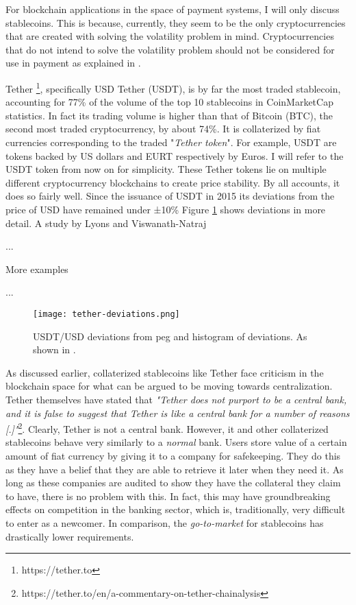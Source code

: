 For blockchain applications in the space of payment systems, I will
only discuss stablecoins. This is because, currently, they seem to be
the only cryptocurrencies that are created with solving the volatility
problem in mind. Cryptocurrencies that do not intend to solve the
volatility problem should not be considered for use in payment as
explained in \cite{yermackBitcoin}.

Tether \footnote{https://tether.to}, specifically USD Tether (USDT),
is by far the most traded stablecoin, accounting for 77\% of the
volume of the top 10 stablecoins in CoinMarketCap statistics. In fact
its trading volume is higher than that of Bitcoin (BTC), the second
most traded cryptocurrency, by about 74\%. It is collaterized by fiat
currencies corresponding to the traded "\textit{Tether token}". For
example, USDT are tokens backed by US dollars and EURT respectively by
Euros. I will refer to the USDT token from now on for simplicity.
These Tether tokens lie on multiple different cryptocurrency
blockchains to create price stability. By all accounts, it does so
fairly well. Since the issuance of USDT in 2015 its deviations from
the price of USD have remained under ±10\% Figure
\ref{fig:tether-deviations} shows deviations in more detail. A study
by Lyons and Viswanath-Natraj \cite{lyonsStable} 

...

More examples

...

\begin{figure}
  \texttt{[image: tether-deviations.png]}
  \caption{USDT/USD deviations from peg and histogram of deviations.
  As shown in \cite{lyonsStable}.}
  \label{fig:tether-deviations}
\end{figure}

As discussed earlier, collaterized stablecoins like Tether face
criticism in the blockchain space for what can be argued to be moving
towards centralization. Tether themselves have stated that
\textit{"Tether does not purport to be a central bank, and it is false
to suggest that Tether is like a central bank for a number of reasons
[.]"}\footnote{https://tether.to/en/a-commentary-on-tether-chainalysis}.
Clearly, Tether is not a central bank. However, it and other
collaterized stablecoins behave very similarly to a \textit{normal}
bank. Users store value of a certain amount of fiat currency by giving
it to a company for safekeeping. They do this as they have a belief
that they are able to retrieve it later when they need it. As long as
these companies are audited to show they have the collateral they
claim to have, there is no problem with this. In fact, this may have
groundbreaking effects on competition in the banking sector, which is,
traditionally, very difficult to enter as a newcomer. In comparison,
the \textit{go-to-market} for stablecoins has drastically lower
requirements.


